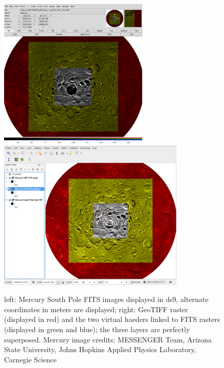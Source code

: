 \begin{figure}[ht!]
\centerline{\includegraphics[height=17pc]{ess_marmo2} \includegraphics[height=17pc]{ess_marmo1}}
\caption{left: Mercury South Pole FITS images displayed in ds9, alternate coordinates in meters
are displayed;
right: GeoTIFF raster (displayed in red) and the two virtual haeders
linked to FITS rasters (displayed in green and blue); the three layers
are perfectly superposed.
Mercury image credits: MESSENGER Team, Arizona State University, Johns Hopkins Applied
Physics Laboratory, Carnegie Science}
\label{fig:ds9qgis}
\end{figure}

